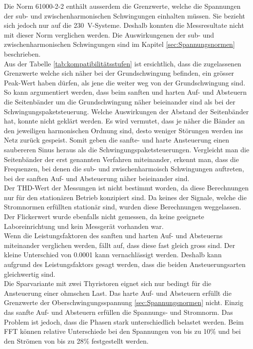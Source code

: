 Die Norm 61000-2-2 enthält ausserdem die Grenzwerte, welche die Spannungen der sub- und zwischenharmonischen Schwingungen einhalten müssen. Sie bezieht sich jedoch nur auf die \SI{230}{V}-Systeme. Deshalb konnten die Messresultate nicht mit dieser Norm verglichen werden. Die Auswirkungenen der sub- und zwischenharmonischen Schwingungen sind im Kapitel \ref{sec:Spannungsnormen} beschrieben.\\ Aus der Tabelle \ref{tab:kompatibilitätsstufen} ist ersichtlich, dass die zugelassenen Grenzwerte welche sich näher bei der Grundschwingung befinden, ein grösser Peak-Wert haben dürfen, als jene die weiter weg von der Grundschwingung sind. So kann argumentiert werden, dass beim sanften und harten Auf- und Absteuern die Seitenbänder um die Grundschwingung näher beieinander sind als bei der Schwingungspaketsteuerung. Welche Auswirkungen der Abstand der Seitenbänder hat, konnte nicht geklärt werden. Es wird vermutet, dass je näher die Bänder an den jeweiligen harmonischen Ordnung sind, desto weniger Störungen werden ins Netz zurück gespeist. Somit geben die sanfte- und harte Ansteuerung einen saubereren Sinus heraus als die Schwingungspaketsteuerungen. Vergleicht man die Seitenbänder der erst genannten Verfahren miteinander, erkennt man, dass die Frequenzen, bei denen die sub- und zwischenharmoisch Schwingungen auftreten, bei der sanften Auf- und Absteuerung näher beieinander sind.\\

Der THD-Wert der Messungen ist nicht bestimmt worden, da diese Berechnungen nur für den stationären Betrieb konzipiert sind. Da keines der Signale, welche die Stromnormen erfüllten stationär sind, wurden diese Berechnungen weggelassen. Der Flickerwert wurde ebenfalls nicht gemessen, da keine geeignete Laboreinrichtung und kein Messgerät vorhanden war.\\

Wenn die Leistungsfaktoren des sanften und harten Auf- und Absteuerns miteinander verglichen werden, fällt auf, dass diese fast gleich gross sind. Der kleine Unterschied von 0.0001 kann vernachlässigt werden. Deshalb kann aufgrund des Leistungsfaktors gesagt werden, dass die beiden Ansteuerungsarten gleichwertig sind.\\

Die Sparvariante mit zwei Thyristoren eignet sich nur bedingt für die Ansteuerung einer ohmschen Last. Das harte Auf- und Absteuern erfüllt die Grenzwerte der Oberschwingungsspannung \ref{sec:Spannungsnormen} nicht. Einzig das sanfte Auf- und Absteuern erfüllen die Spannungs- und Stromnorm. Das Problem ist jedoch, dass die Phasen stark unterschiedlich belastet werden. Beim FFT können relative Unterschiede bei den Spannungen von bis zu 10\% und bei den Strömen von bis zu 28\% festgestellt werden.\\


